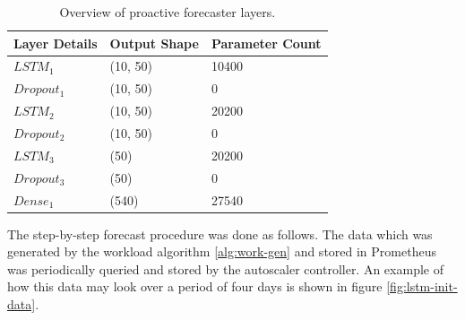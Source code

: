 \begin{table}
    \caption{Overview of proactive forecaster layers.}\label{tab:lstm-layers}
    \centering
    \begin{tabular}{|l|l|l|}
        \hline
        Layer Details & Output Shape & Parameter Count\\
        \hline
        $LSTM_{1}$ & (10, 50) & 10400\\
        $Dropout_{1}$ & (10, 50) & 0\\
        $LSTM_{2}$ & (10, 50) & 20200\\
        $Dropout_{2}$ & (10, 50) & 0\\
        $LSTM_{3}$ & (50) & 20200\\
        $Dropout_{3}$ & (50) & 0\\
        $Dense_{1}$ & (540) & 27540\\
        \hline
    \end{tabular}
\end{table}

The step-by-step forecast procedure was done as follows. The data which was generated by the workload algorithm \ref{alg:work-gen} and stored in Prometheus was periodically queried and stored by the autoscaler controller. An example of how this data may look over a period of four days is shown in figure \ref{fig:lstm-init-data}.

\begin{center}
\begin{minipage}{\linewidth}
    \label{fig:lstm-init-data}
\end{minipage}
\end{center}

